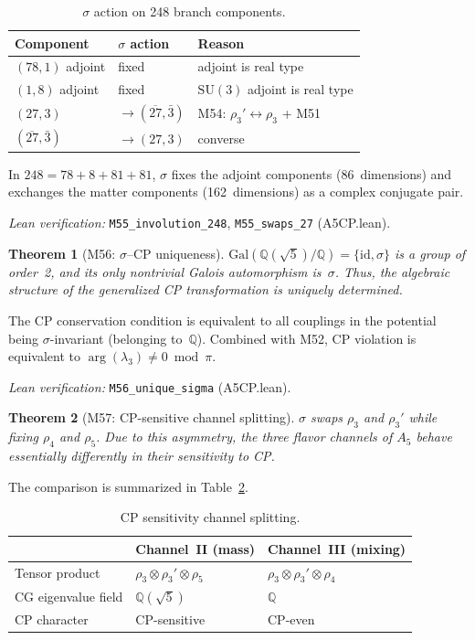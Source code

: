 \documentclass[sn-mathphys-num,Numbered]{sn-jnl}
\theoremstyle{thmstyleone}
\newtheorem{theorem}{Theorem}[section]
\theoremstyle{thmstylethree}
\newcommand{\SU}{\mathrm{SU}}
\newcommand{\Gal}{\mathrm{Gal}}
\begin{document}
\begin{table}[htb]
\centering
\caption{$\sigma$ action on 248 branch components.}\label{tab:sigma248}
\begin{tabular}{lll}
\toprule
Component & $\sigma$ action & Reason \\
\midrule
$(78,1)$ adjoint & fixed & adjoint is real type \\
$(1,8)$ adjoint  & fixed & $\SU(3)$ adjoint is real type \\
$(27,3)$  & $\to (\overline{27}, \bar{3})$ & M54: $\rho_3' \leftrightarrow \rho_3$ + M51 \\
$(\overline{27}, \bar{3})$ & $\to (27,3)$ & converse \\
\bottomrule
\end{tabular}
\end{table}

In $248 = 78 + 8 + 81 + 81$, $\sigma$ fixes the adjoint components
(86~dimensions) and exchanges the matter components (162~dimensions) as a
complex conjugate pair.

\noindent\textit{Lean verification:}
\texttt{M55\_involution\_248}, \texttt{M55\_swaps\_27} (A5CP.lean).

\begin{theorem}[M56: $\sigma$--CP uniqueness]\label{thm:M56}
$\Gal(\mathbb{Q}(\sqrt{5})/\mathbb{Q}) = \{\mathrm{id}, \sigma\}$ is a group
of order~2, and its only nontrivial Galois automorphism is~$\sigma$.  Thus,
the algebraic structure of the generalized CP transformation is uniquely
determined.
\end{theorem}

The CP conservation condition is equivalent to all couplings in the potential
being $\sigma$-invariant (belonging to~$\mathbb{Q}$).  Combined with M52, CP
violation is equivalent to $\arg(\lambda_3) \neq 0 \bmod \pi$.

\noindent\textit{Lean verification:}
\texttt{M56\_unique\_sigma} (A5CP.lean).

\begin{theorem}[M57: CP-sensitive channel splitting]\label{thm:M57}
$\sigma$ swaps $\rho_3$ and $\rho_3'$ while fixing $\rho_4$ and $\rho_5$.
Due to this asymmetry, the three flavor channels of $A_5$ behave essentially
differently in their sensitivity to CP.
\end{theorem}

The comparison is summarized in Table~\ref{tab:CPchannels}.

\begin{table}[htb]
\centering
\caption{CP sensitivity channel splitting.}\label{tab:CPchannels}
\begin{tabular}{lll}
\toprule
 & Channel~II (mass) & Channel~III (mixing) \\
\midrule
Tensor product & $\rho_3 \otimes \rho_3' \otimes \rho_5$ &
  $\rho_3 \otimes \rho_3' \otimes \rho_4$ \\
CG eigenvalue field & $\mathbb{Q}(\sqrt{5})$ & $\mathbb{Q}$ \\
CP character & CP-sensitive & CP-even \\
\bottomrule
\end{tabular}
\end{table}
\end{document}
